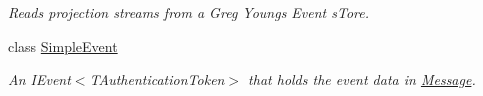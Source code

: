 \begin{DoxyCompactItemize}
\begin{DoxyCompactList}\small\item\em Reads projection streams from a Greg Young\textquotesingle{}s Event s\+Tore. \end{DoxyCompactList}\item 
class \hyperlink{classCqrs_1_1EventStore_1_1SimpleEvent}{Simple\+Event}
\begin{DoxyCompactList}\small\item\em An I\+Event$<$\+T\+Authentication\+Token$>$ that holds the event data in \hyperlink{classCqrs_1_1EventStore_1_1SimpleEvent_a4e07144de1cdb94bbbf1313eb0e1f35d_a4e07144de1cdb94bbbf1313eb0e1f35d}{Message}. \end{DoxyCompactList}\end{DoxyCompactItemize}
